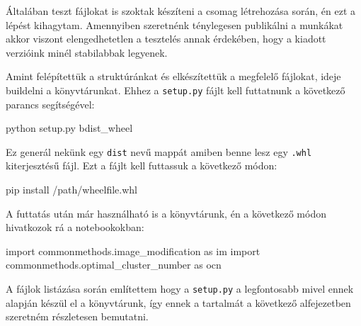 Általában teszt fájlokat is szoktak készíteni a csomag létrehozása során, én ezt a lépést kihagytam. Amennyiben szeretnénk ténylegesen publikálni a munkákat akkor viszont elengedhetetlen a tesztelés annak érdekében, hogy a kiadott verzióink minél stabilabbak legyenek.

Amint felépítettük a struktúránkat és elkészítettük a megfelelő fájlokat, ideje buildelni a könyvtárunkat. Ehhez a \texttt{setup.py} fájlt kell futtatnunk a következő parancs segítségével:
\begin{python}
python setup.py bdist_wheel
\end{python}

Ez generál nekünk egy \texttt{dist} nevű mappát amiben benne lesz egy \texttt{.whl} kiterjesztésű fájl. Ezt a fájlt kell futtassuk a következő módon:

\begin{python}
pip install /path/wheelfile.whl
\end{python}

A futtatás után már használható is a könyvtárunk, én a következő módon hivatkozok rá a notebookokban:
\begin{python}
import commonmethods.image_modification as im
import commonmethods.optimal_cluster_number as ocn
\end{python}

A fájlok listázása során említettem hogy a \texttt{setup.py} a legfontosabb mivel ennek alapján készül el a könyvtárunk, így ennek a tartalmát a következő alfejezetben szeretném részletesen bemutatni.


